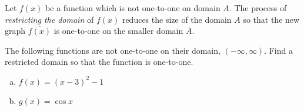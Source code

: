 \documentclass[notes]{subfiles}
\begin{document}
		\begin{rmk}
			Let \(f(x)\) be a function which is not one-to-one on domain \(A\). The process of \emph{restricting the domain} of \(f(x)\) reduces the size of the domain \(A\) so that the new graph \(\overline{f(x)}\) is one-to-one on the smaller domain \(\overline{A}\).
		\end{rmk}	
		
		\begin{ex}
			The following functions are not one-to-one on their domain, \((-\infty,\infty)\). Find a restricted domain so that the function is one-to-one.
			\begin{enumerate}[(a)]
				\item \(f(x) = (x-3)^2 -1\)
					
				\item \(g(x) = \cos x\)
			\end{enumerate}
		\end{ex}
		
		
		
\clearpage
\end{document}
